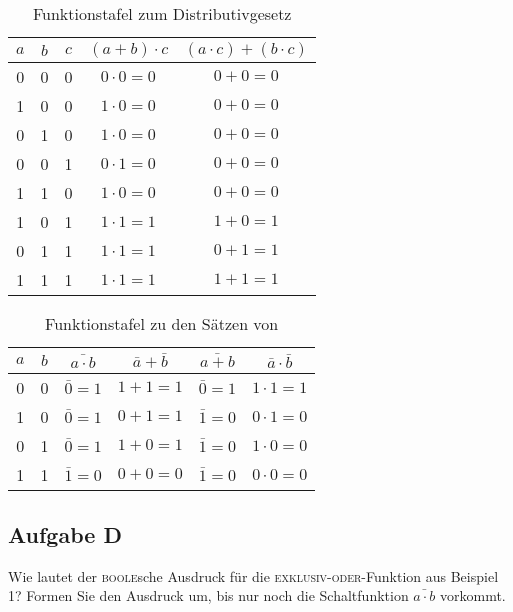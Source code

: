 \begin{table}
    \centering
    \begin{tabular}{ccc|c|c}
        $a$ & $b$ & $c$ & $(a + b) \cdot c$ & $(a \cdot c) + (b \cdot c)$
        \\
        \hline
        0 & 0 & 0 & $0 \cdot 0 = 0$ & $0 + 0 = 0$\\
        1 & 0 & 0 & $1 \cdot 0 = 0$ & $0 + 0 = 0$\\
        0 & 1 & 0 & $1 \cdot 0 = 0$ & $0 + 0 = 0$\\
        0 & 0 & 1 & $0 \cdot 1 = 0$ & $0 + 0 = 0$\\
        1 & 1 & 0 & $1 \cdot 0 = 0$ & $0 + 0 = 0$\\
        1 & 0 & 1 & $1 \cdot 1 = 1$ & $1 + 0 = 1$\\
        0 & 1 & 1 & $1 \cdot 1 = 1$ & $0 + 1 = 1$\\
        1 & 1 & 1 & $1 \cdot 1 = 1$ & $1 + 1 = 1$
    \end{tabular}
    \caption{%
        Funktionstafel zum Distributivgesetz
    }
    \label{tab:Aufgabe_C_dist}
\end{table}

\begin{table}
    \centering
    \begin{tabular}{cc|cc|cc}
        $a$ & $b$ & $\bar{a \cdot b}$ & $\bar a + \bar b$ & $\bar{a + b}$ & $
        \bar a \cdot \bar b$\\
        \hline
        0 & 0 & $\bar 0 = 1$ & $1 + 1 = 1$ & $\bar 0 = 1$ & $1 \cdot 1 = 1$\\
        1 & 0 & $\bar 0 = 1$ & $0 + 1 = 1$ & $\bar 1 = 0$ & $0 \cdot 1 = 0$\\
        0 & 1 & $\bar 0 = 1$ & $1 + 0 = 1$ & $\bar 1 = 0$ & $1 \cdot 0 = 0$\\
        1 & 1 & $\bar 1 = 0$ & $0 + 0 = 0$ & $\bar 1 = 0$ & $0 \cdot 0 = 0$
    \end{tabular}
    \caption{%
        Funktionstafel zu den Sätzen von 
    }
    \label{tab:Aufgabe_C_demo}
\end{table}

\FloatBarrier
\subsection{Aufgabe D} 

\begin{problem}
    Wie lautet der \textsc{boole}sche Ausdruck für die
    \textsc{exklusiv-oder}-Funktion aus Beispiel 1? Formen Sie den Ausdruck um,
    bis nur noch die Schaltfunktion $\bar{a \cdot b}$ vorkommt.
\end{problem}

